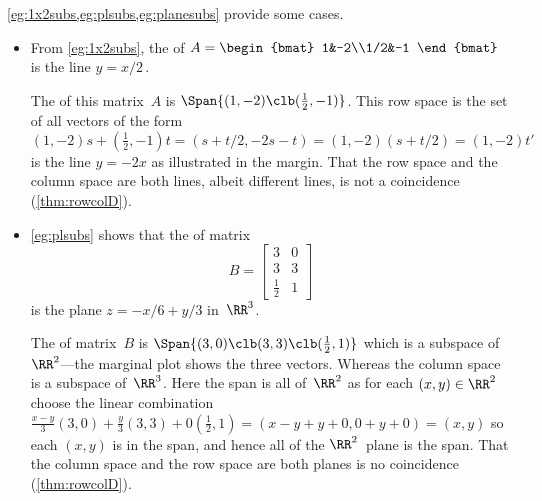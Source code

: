 \begin{example} 
\cref{eg:1x2subs,eg:plsubs,eg:planesubs} provide some cases.
\begin{itemize}
\item From \cref{eg:1x2subs}, the  of \(A=\begin{bmat} 1&-2\\1/2&-1 \end{bmat}\) is the line \(y=x/2\)\,.

The  of this matrix~\(A\) is \(\Span\{(1,-2)\clb (\frac12,-1)\}\).
%
This row space is the set of all vectors of the form \((1,-2)s+(\frac12,-1)t=(s+t/2,-2s-t)=(1,-2)(s+t/2)=(1,-2)t'\) is the line \(y=-2x\) as illustrated in the margin.
That the row space and the column space are both lines, albeit different lines, is not a coincidence (\cref{thm:rowcolD}).

\item \cref{eg:plsubs} shows that the  of matrix
\begin{equation*}
B=\begin{bmatrix} 3&0\\3&3\\\frac12&1 \end{bmatrix}
\end{equation*}
is the plane \(z=-x/6+y/3\) in~\(\RR^3\).

The  of matrix~\(B\) is \(\Span\{(3,0)\clb (3,3)\clb (\frac12,1)\}\) which is a subspace of~\(\RR^2\)---the marginal plot shows the three vectors. 
%
Whereas the column space is a subspace of~\(\RR^3\).
Here the span is all of~\(\RR^2\) as for each \((x,y)\in\RR^2\) choose  the linear combination \(\frac{x-y}3(3,0)+\frac{y}3(3,3)+0(\frac12,1)=(x-y+y+0,0+y+0)=(x,y)\) so each \((x,y)\) is in the span, and hence all of the \(\RR^2\)~plane is the span.
That the column space and the row space are both planes is no coincidence (\cref{thm:rowcolD}).


\end{itemize}
\end{example}
